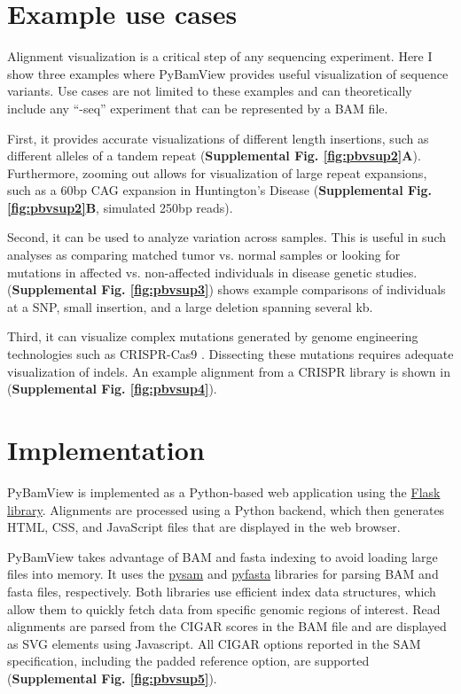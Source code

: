 \section{Example use cases}
Alignment visualization is a critical step of any sequencing experiment. Here I show three examples where PyBamView provides useful visualization of sequence variants. Use cases are not limited to these examples and can theoretically include any ``-seq'' experiment that can be represented by a BAM file.

First, it provides accurate visualizations of different length insertions, such as different alleles of a tandem repeat (\textbf{Supplemental Fig. \ref{fig:pbvsup2}A}). Furthermore, zooming out allows for visualization of large repeat expansions, such as a 60bp CAG expansion in Huntington's Disease (\textbf{Supplemental Fig. \ref{fig:pbvsup2}B}, simulated 250bp reads).

Second, it can be used to analyze variation across samples. This is useful in such analyses as comparing matched tumor vs. normal samples or looking for mutations in affected vs. non-affected individuals in disease genetic studies. (\textbf{Supplemental Fig. \ref{fig:pbvsup3}}) shows example comparisons of individuals at a SNP, small insertion, and a large deletion spanning several kb.

Third, it can visualize complex mutations generated by genome engineering technologies such as CRISPR-Cas9 \cite{CongRanCoxEtAl2013}. Dissecting these mutations requires adequate visualization of indels. An example alignment from a CRISPR library is shown in (\textbf{Supplemental Fig. \ref{fig:pbvsup4}}).

\section{Implementation}
PyBamView is implemented as a Python-based web application using the \href{http://flask.pocoo.org/}{Flask library}. Alignments are processed using a Python backend, which then generates HTML, CSS, and JavaScript files that are displayed in the web browser.

PyBamView takes advantage of BAM and fasta indexing to avoid loading large files into memory. It uses the \href{https://code.google.com/p/pysam/}{pysam} and \href{https://pypi.python.org/pypi/pyfasta/}{pyfasta} libraries for parsing BAM and fasta files, respectively. Both libraries use efficient index data structures, which allow them to quickly fetch data from specific genomic regions of interest. Read alignments are parsed from the CIGAR scores in the BAM file and are displayed  as SVG elements using Javascript. All CIGAR options reported in the SAM specification, including the padded reference option, are supported (\textbf{Supplemental Fig. \ref{fig:pbvsup5}}). 

